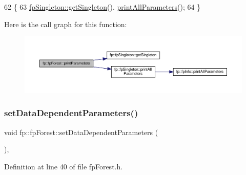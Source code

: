 \begin{DoxyCode}
62                                          \{
63                 \hyperlink{classfp_1_1fpSingleton_a8bdae77b68521003e3fc630edec2e240}{fpSingleton::getSingleton}().
      \hyperlink{classfp_1_1fpSingleton_a0d769b6652e4c74c2734cdc811eeab5a}{printAllParameters}();
64             \}
\end{DoxyCode}
Here is the call graph for this function\+:\nopagebreak
\begin{figure}[H]
\begin{center}
\leavevmode
\includegraphics[width=350pt]{classfp_1_1fpForest_ae096def0ca26f0771b27341d7b218066_cgraph}
\end{center}
\end{figure}
\mbox{\label{classfp_1_1fpForest_a846818c46a4423f668f19d3493864192}} 
\subsubsection{\texorpdfstring{set\+Data\+Dependent\+Parameters()}{setDataDependentParameters()}}
{\footnotesize\ttfamily void fp\+::fp\+Forest\+::set\+Data\+Dependent\+Parameters (\begin{DoxyParamCaption}{ }\end{DoxyParamCaption})\hspace{0.3cm}{\ttfamily [inline]}, {\ttfamily [protected]}}



Definition at line 40 of file fp\+Forest.\+h.


